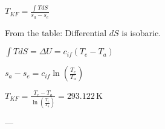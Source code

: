 \( T_{KF} = \frac{\int T dS}{s_a - s_e} \)  

From the table: Differential \( dS \) is isobaric.  

\( \int T dS = \Delta U = c_{if} (T_e - T_a) \)  

\( s_a - s_e = c_{if} \ln \left( \frac{T_e}{T_a} \right) \)  

\( T_{KF} = \frac{T_e - T_a}{\ln \left( \frac{T_e}{T_a} \right)} = 293.122 \, \text{K} \)  

---